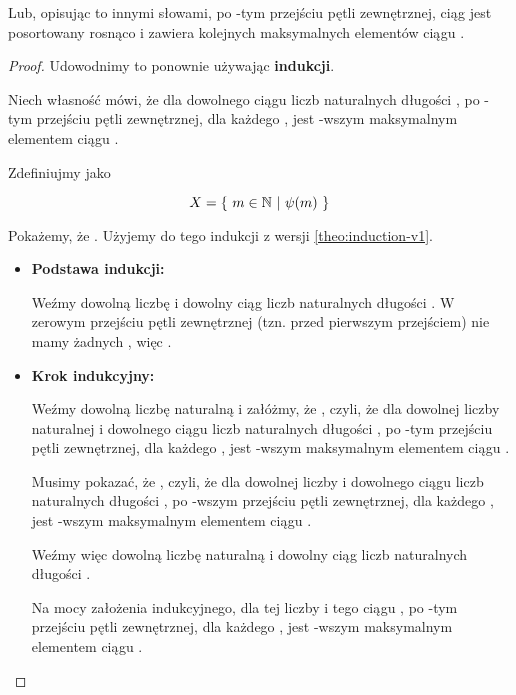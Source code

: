 \begin{example}
\begin{theo}
Lub, opisując to innymi słowami, po -tym przejściu pętli zewnętrznej, ciąg  jest posortowany rosnąco i zawiera  kolejnych maksymalnych elementów ciągu .
\end{theo}

\begin{proof}
Udowodnimy to ponownie używając \textbf{indukcji}.

Niech własność  mówi, że dla dowolnego ciągu liczb naturalnych  długości , po -tym przejściu pętli zewnętrznej, dla każdego ,  jest -wszym maksymalnym elementem ciągu .

Zdefiniujmy  jako

\[
    X = \{\ m \in \mathbb{N}\ |\ \psi(m)\ \}
\]

Pokażemy, że . Użyjemy do tego indukcji z wersji \ref{theo:induction-v1}.

\begin{itemize}
    \item \textbf{Podstawa indukcji:}
    
    Weźmy dowolną liczbę  i dowolny ciąg liczb naturalnych  długości . W zerowym przejściu pętli zewnętrznej (tzn. przed pierwszym przejściem) nie mamy żadnych , więc .
    
    \item \textbf{Krok indukcyjny:}
    
    Weźmy dowolną liczbę naturalną  i załóżmy, że , czyli, że dla dowolnej liczby naturalnej  i dowolnego ciągu liczb naturalnych  długości , po -tym przejściu pętli zewnętrznej, dla każdego ,  jest -wszym maksymalnym elementem ciągu .
    
    Musimy pokazać, że , czyli, że dla dowolnej liczby  i dowolnego ciągu liczb naturalnych  długości , po -wszym przejściu pętli zewnętrznej, dla każdego ,  jest -wszym maksymalnym elementem ciągu .
    
    Weźmy więc dowolną liczbę naturalną  i dowolny ciąg liczb naturalnych  długości .
    
    Na mocy założenia indukcyjnego, dla tej liczby  i tego ciągu , po -tym przejściu pętli zewnętrznej, dla każdego ,  jest -wszym maksymalnym elementem ciągu .
    

\end{itemize}
\end{proof}
\end{example}
